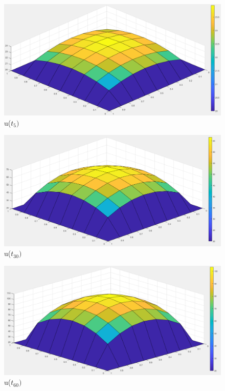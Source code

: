 \documentclass{report}
\begin{document}
\begin{figure}
	\includegraphics[width=\linewidth]{Aufgaben-Ressourcen/P2A5T5.png}
		\caption{u($t_{5})$}
\end{figure}
\begin{figure}
	\includegraphics[width=\linewidth]{Aufgaben-Ressourcen/P2A5T30.png}
		\caption{u($t_{30})$}
\end{figure}
\begin{figure}
	\includegraphics[width=\linewidth]{Aufgaben-Ressourcen/P2A5T60.png}
		\caption{u($t_{60})$}
\end{figure}


	
\end{document}
